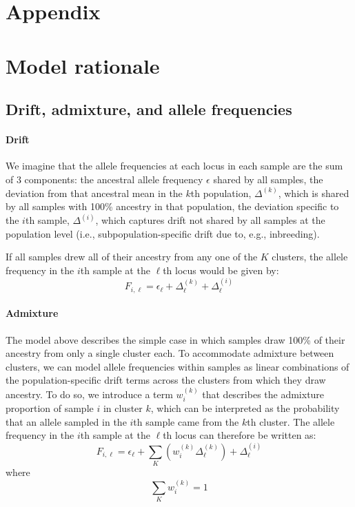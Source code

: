 \documentclass[12pt]{article}
\begin{document}
\newpage
\section*{Appendix}
\renewcommand{\theequation}{A\arabic{equation}}
\setcounter{equation}{0}
\renewcommand{\thetable}{A\arabic{table}}
\setcounter{table}{0}
\renewcommand{\thefigure}{S\arabic{figure}}
\setcounter{figure}{0}


\section{Model rationale}
\subsection{Drift, admixture, and allele frequencies}
\paragraph{Drift} 
We imagine that the allele frequencies at each locus in each sample are the sum of 3 components: 
the ancestral allele frequency $\epsilon$ shared by all samples,
the deviation from that ancestral mean in the $k$th population, $\Delta^{(k)}$,
which is shared by all samples with 100\% ancestry in that population,
the deviation specific to the $i$th sample, $\Delta^{(i)}$,
which captures drift not shared by all samples at the population level
(i.e., subpopulation-specific drift due to, e.g., inbreeding).

If all samples drew all of their ancestry from any one of the $K$ clusters,
the  allele frequency in the $i$th sample at the $\ell$th locus would be given by:
\begin{equation}
F_{i,\ell} = \epsilon_{\ell} + \Delta^{(k)}_{\ell} + \Delta^{(i)}_{\ell}
\label{drift_terms_no_admix}
\end{equation}

\paragraph{Admixture} 
The model above describes the simple case 
in which samples draw 100\% of their ancestry from only a single cluster each. 
To accommodate admixture between clusters, 
we can model allele frequencies within samples as linear combinations of the population-specific 
drift terms across the clusters from which they draw ancestry.
To do so, we introduce a term $w^{(k)}_{i}$ that describes the admixture proportion of sample $i$ in cluster $k$,
which can be interpreted as the probability that an allele sampled in the $i$th sample came from the $k$th cluster.
The allele frequency in the $i$th sample at the $\ell$th locus can therefore be written as:
%
\begin{equation}
F_{i,\ell} = \epsilon_{\ell} + \sum\limits_{K} \left( w^{(k)}_{i} \Delta^{(k)}_{\ell} \right) + \Delta^{(i)}_{\ell}	
\label{drift_terms_admix}
\end{equation}
%
where
%
\begin{equation}
\sum\limits_{K}w^{(k)}_{i} = 1
\end{equation}
\end{document}
